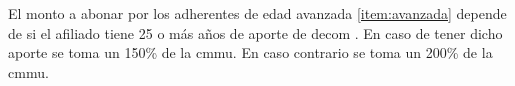 


El monto a abonar por los adherentes de edad avanzada \ref{item:avanzada} depende de si el afiliado tiene 25 o más años de aporte de \acrfull{decom} \cite{dospuRes7}.
En caso de tener dicho aporte se toma un 150\% de la \acrshort{cmmu}. 
En caso contrario se toma un 200\% de la \acrshort{cmmu}.





